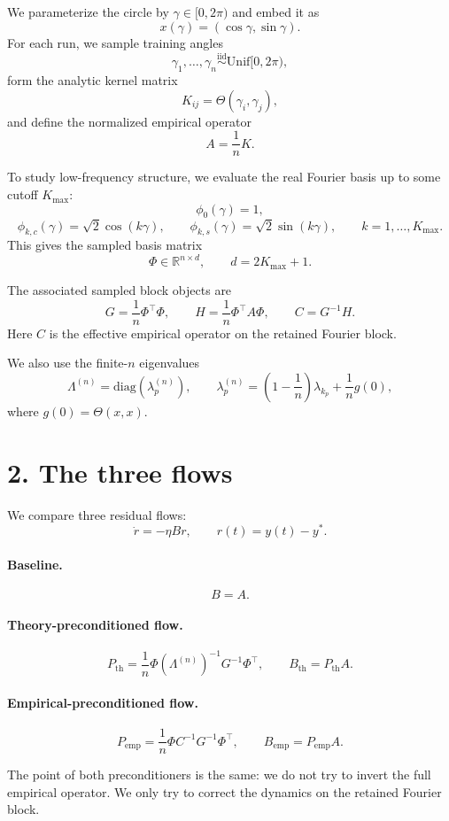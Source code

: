 \documentclass[11pt]{article}
\begin{document}
We parameterize the circle by $\gamma\in[0,2\pi)$ and embed it as
\[
	x(\gamma)=(\cos\gamma,\sin\gamma).
\]
For each run, we sample training angles
\[
	\gamma_1,\dots,\gamma_n \overset{\mathrm{iid}}{\sim} \mathrm{Unif}[0,2\pi),
\]
form the analytic kernel matrix
\[
	K_{ij}=\Theta(\gamma_i,\gamma_j),
\]
and define the normalized empirical operator
\[
	A=\frac{1}{n}K.
\]

To study low-frequency structure, we evaluate the real Fourier basis up to some cutoff $K_{\max}$:
\[
	\phi_0(\gamma)=1,
\]
\[
	\phi_{k,c}(\gamma)=\sqrt{2}\cos(k\gamma),\qquad
	\phi_{k,s}(\gamma)=\sqrt{2}\sin(k\gamma),
	\qquad k=1,\dots,K_{\max}.
\]
This gives the sampled basis matrix
\[
	\Phi\in\mathbb{R}^{n\times d},
	\qquad d=2K_{\max}+1.
\]

The associated sampled block objects are
\[
	G=\frac{1}{n}\Phi^\top\Phi,
	\qquad
	H=\frac{1}{n}\Phi^\top A\Phi,
	\qquad
	C=G^{-1}H.
\]
Here $C$ is the effective empirical operator on the retained Fourier block.

We also use the finite-$n$ eigenvalues
\[
	\Lambda^{(n)}=\mathrm{diag}(\lambda_p^{(n)}),
	\qquad
	\lambda_p^{(n)}=
	\left(1-\frac1n\right)\lambda_{k_p}+\frac1n g(0),
\]
where $g(0)=\Theta(x,x)$.

\section*{2. The three flows}

We compare three residual flows:
\[
	\dot r=-\eta B r,
	\qquad r(t)=y(t)-y^*.
\]

\paragraph{Baseline.}
\[
	B=A.
\]

\paragraph{Theory-preconditioned flow.}
\[
	P_{\mathrm{th}}=\frac1n \Phi (\Lambda^{(n)})^{-1} G^{-1}\Phi^\top,
	\qquad
	B_{\mathrm{th}}=P_{\mathrm{th}}A.
\]

\paragraph{Empirical-preconditioned flow.}
\[
	P_{\mathrm{emp}}=\frac1n \Phi C^{-1} G^{-1}\Phi^\top,
	\qquad
	B_{\mathrm{emp}}=P_{\mathrm{emp}}A.
\]

The point of both preconditioners is the same: we do not try to invert the full empirical operator. We only try to correct the dynamics on the retained Fourier block.
\end{document}
